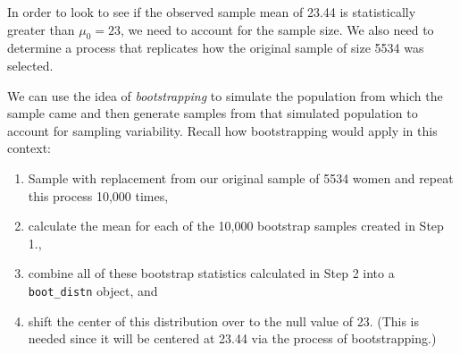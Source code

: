\documentclass[12pt, krantz2,]{krantz}
\makeatletter
\newenvironment{Shaded}{\begin{snugshade}}{\end{snugshade}}
\newcommand{\DataTypeTok}[1]{\textcolor[rgb]{0.27,0.27,0.27}{#1}}
\newcommand{\DecValTok}[1]{\textcolor[rgb]{0.06,0.06,0.06}{#1}}
\newcommand{\KeywordTok}[1]{\textcolor[rgb]{0.27,0.27,0.27}{\textbf{#1}}}
\newcommand{\NormalTok}[1]{#1}
\newcommand{\OperatorTok}[1]{\textcolor[rgb]{0.43,0.43,0.43}{\textbf{#1}}}
\newcommand{\StringTok}[1]{\textcolor[rgb]{0.5,0.5,0.5}{#1}}
\providecommand{\tightlist}{%
  \setlength{\itemsep}{0pt}\setlength{\parskip}{0pt}}
\newenvironment{kframe}{%
\medskip{}
\setlength{\fboxsep}{.8em}
 \def\at@end@of@kframe{}%
 \ifinner\ifhmode%
  \def\at@end@of@kframe{\end{minipage}}%
  \begin{minipage}{\columnwidth}%
 \fi\fi%
 \def\FrameCommand##1{\hskip\@totalleftmargin \hskip-\fboxsep
 \colorbox{shadecolor}{##1}\hskip-\fboxsep
     \hskip-\linewidth \hskip-\@totalleftmargin \hskip\columnwidth}%
 \MakeFramed {\advance\hsize-\width
   \@totalleftmargin\z@ \linewidth\hsize
   \@setminipage}}%
 {\par\unskip\endMakeFramed%
 \at@end@of@kframe}
\renewenvironment{Shaded}{\begin{kframe}}{\end{kframe}}
\makeatother
\begin{document}
In order to look to see if the observed sample mean of 23.44 is statistically greater than \(\mu_0 = 23\), we need to account for the sample size. We also need to determine a process that replicates how the original sample of size 5534 was selected.

We can use the idea of \emph{bootstrapping} to simulate the population from which the sample came and then generate samples from that simulated population to account for sampling variability. Recall how bootstrapping would apply in this context:

\begin{enumerate}
\def\labelenumi{\arabic{enumi}.}
\tightlist
\item
  Sample with replacement from our original sample of 5534 women and repeat this process 10,000 times,
\item
  calculate the mean for each of the 10,000 bootstrap samples created in Step 1.,
\item
  combine all of these bootstrap statistics calculated in Step 2 into a \texttt{boot\_distn} object, and
\item
  shift the center of this distribution over to the null value of 23. (This is needed since it will be centered at 23.44 via the process of bootstrapping.)
\end{enumerate}

\begin{Shaded}
\end{Shaded}

\begin{Shaded}
\end{Shaded}
\end{document}
